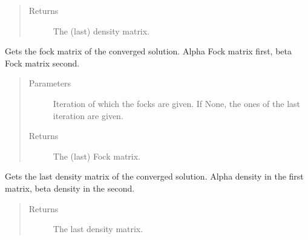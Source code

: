 \documentclass[letterpaper,10pt,english]{sphinxmanual}
\begin{document}
\begin{fulllineitems}
\begin{fulllineitems}
\begin{quote}
\begin{description}
\item[{Returns}] \leavevmode
The (last) density matrix.

\end{description}\end{quote}

\end{fulllineitems}


\begin{fulllineitems}
\label{\detokenize{cUHF_b:hf.HartreeFock.cUHF_b.MF.get_fock}}
Gets the fock matrix of the converged solution.
Alpha Fock matrix first, beta Fock matrix second.
\begin{quote}\begin{description}
\item[{Parameters}] \leavevmode
{} \textendash{} Iteration of which the focks are given. If None, the ones of the last iteration are given.

\item[{Returns}] \leavevmode
The (last) Fock matrix.

\end{description}\end{quote}

\end{fulllineitems}


\begin{fulllineitems}
\label{\detokenize{cUHF_b:hf.HartreeFock.cUHF_b.MF.get_last_dens}}
Gets the last density matrix of the converged solution.
Alpha density in the first matrix, beta density in the second.
\begin{quote}\begin{description}
\item[{Returns}] \leavevmode
The last density matrix.

\end{description}\end{quote}

\end{fulllineitems}


\end{fulllineitems}
\end{document}
